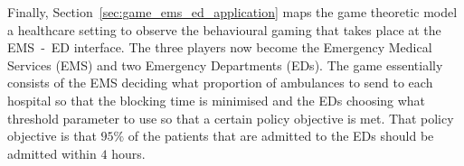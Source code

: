 Finally, Section~\ref{sec:game_ems_ed_application} maps the game theoretic
model a healthcare setting to observe the behavioural gaming that takes place
at the EMS~-~ED interface.
The three players now become the Emergency Medical Services (EMS) and two
Emergency Departments (EDs).
The game essentially consists of the EMS deciding what proportion of
ambulances to send to each hospital so that the blocking time is minimised and
the EDs choosing what threshold parameter to use so that a certain policy
objective is met.
That policy objective is that \(95\%\) of the patients that are admitted to
the EDs should be admitted within \(4\) hours.
